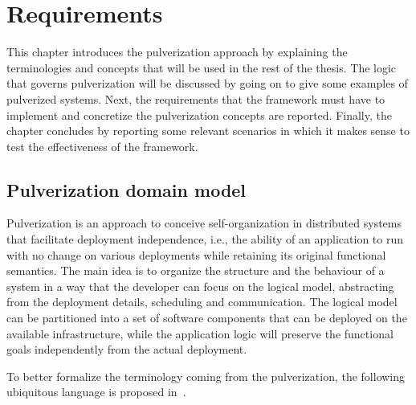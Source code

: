 \chapter{Requirements}
\label{chap:requirements}

This chapter introduces the pulverization approach by explaining the terminologies and concepts that will be used in the rest of the thesis.
The logic that governs pulverization will be discussed by going on to give some examples of pulverized systems.
Next, the requirements that the framework must have to implement and concretize the pulverization concepts are reported. Finally, the
chapter concludes by reporting some relevant scenarios in which it makes sense to test the effectiveness of the framework.

\section{Pulverization domain model}
\label{sec:pulverization-domain-model}

Pulverization is an approach to conceive self-organization in distributed systems that facilitate deployment independence, i.e., the ability of an
application to run with no change on various deployments while retaining its original functional semantics.
The main idea is to organize the structure and the behaviour of a system in a way that the developer can focus on the logical model, abstracting from
the deployment details, scheduling and communication.
The logical model can be partitioned into a set of software components that can be deployed on the available infrastructure, while the application
logic will preserve the functional goals independently from the actual deployment.

To better formalize the terminology coming from the pulverization, the following ubiquitous language is proposed in~.

